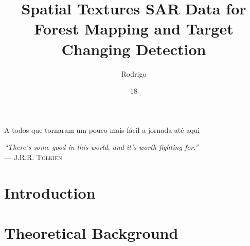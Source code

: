 \documentclass[msc, eng]{ita}    %
\author{Rodrigo}{Aragão Santos}
\title{Spatial Textures SAR Data for Forest Mapping and Target Changing Detection}
\date{18}{Novembro}{2021}
\begin{document}
\maketitle %

\begin{itadedication}
A todos que tornaram um pouco mais fácil a jornada até aqui
\end{itadedication}

\begin{itathanks}

\end{itathanks}

\thispagestyle{empty}
\ifhyperref{}\fi
\begin{flushright}
\begin{spacing}{1}
\mbox{}\vfill
{\sffamily\itshape
``There’s some good in this world, and it’s worth fighting for.''\\}
--- \textsc{J.R.R. Tolkien}
\end{spacing}
\end{flushright}

\begin{abstract}
\noindent

\end{abstract}

\begin{englishabstract}
\noindent

\end{englishabstract}

\listoffigures %


\listofabbreviations


\tableofcontents

\mainmatter

\chapter{Introduction}




\chapter{Theoretical Background}
\label{cap:intro}

\end{document}
